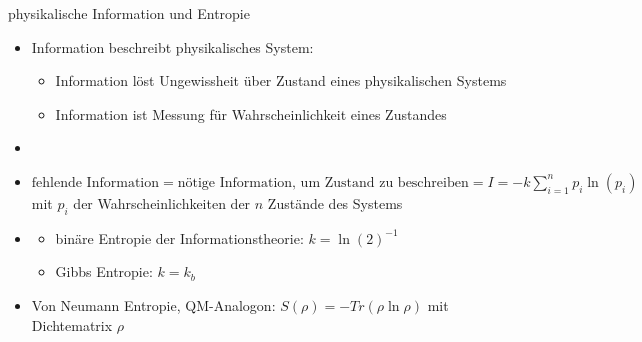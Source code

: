 \documentclass[aspectratio=1610, 9pt]{beamer}
\begin{document}
\begin{frame}{physikalische Information und Entropie}
  \begin{itemize}
    \item Information beschreibt physikalisches System:
    \begin{itemize}
      \item[\bullet] Information löst Ungewissheit über Zustand eines physikalischen Systems
      \item[\bullet] Information ist Messung für Wahrscheinlichkeit eines Zustandes
    \end{itemize}
    \item[]
    \item $\text{fehlende Information} = \text{nötige Information, um Zustand zu beschreiben} = I = -k \sum_{i=1}^n{p_i \ln(p_i)}$ \\ mit $p_i$ der Wahrscheinlichkeiten der $n$ Zustände des Systems
    \item[]
    \begin{itemize}
      \item[\rightarrow] binäre Entropie der Informationstheorie: $k = \ln(2)^{-1}$
      \item[\rightarrow] Gibbs Entropie: $k = k_b$
    \end{itemize}
    \item Von Neumann Entropie, QM-Analogon: $S(\rho) = -Tr(\rho \ln\rho)$ mit Dichtematrix $\rho$
  \end{itemize}
\end{frame}
\end{document}
